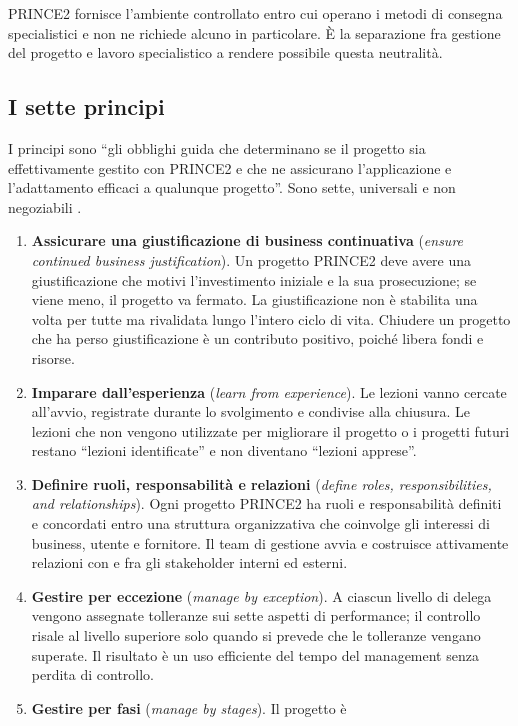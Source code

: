 PRINCE2 fornisce l'ambiente controllato entro cui operano i metodi di consegna
specialistici e non ne richiede alcuno in particolare. \`E la separazione fra
gestione del progetto e lavoro specialistico a rendere possibile questa
neutralit\`a.


\subsection{I sette principi}

I principi sono ``gli obblighi guida che determinano se il progetto sia
effettivamente gestito con PRINCE2 e che ne assicurano l'applicazione e
l'adattamento efficaci a qualunque progetto''. Sono sette, universali e non
negoziabili \cite{prince27}.

\begin{enumerate}
\item \textbf{Assicurare una giustificazione di business continuativa}
(\emph{ensure continued business justification}). Un progetto PRINCE2 deve avere
una giustificazione che motivi l'investimento iniziale e la sua prosecuzione; se
viene meno, il progetto va fermato. La giustificazione non \`e stabilita una
volta per tutte ma rivalidata lungo l'intero ciclo di vita.
Chiudere un progetto che ha perso giustificazione \`e un
contributo positivo, poich\'e libera fondi e risorse.
\item \textbf{Imparare dall'esperienza} (\emph{learn from experience}). Le
lezioni vanno cercate all'avvio, registrate durante lo svolgimento e condivise
alla chiusura. Le lezioni che non vengono utilizzate per migliorare il progetto
o i progetti futuri restano ``lezioni identificate'' e non diventano ``lezioni
apprese''.
\item \textbf{Definire ruoli, responsabilit\`a e relazioni} (\emph{define roles,
responsibilities, and relationships}). Ogni progetto PRINCE2 ha ruoli e
responsabilit\`a definiti e concordati entro una struttura organizzativa che
coinvolge gli interessi di business, utente e fornitore. Il team di gestione
avvia e costruisce attivamente relazioni con e fra gli stakeholder interni ed
esterni.
\item \textbf{Gestire per eccezione} (\emph{manage by exception}). A ciascun
livello di delega vengono assegnate tolleranze sui sette aspetti di performance;
il controllo risale al livello superiore solo quando si prevede che le
tolleranze vengano superate. Il risultato \`e un uso efficiente del tempo del
management senza perdita di controllo.
\item \textbf{Gestire per fasi} (\emph{manage by stages}). Il progetto \`e

\end{enumerate}

